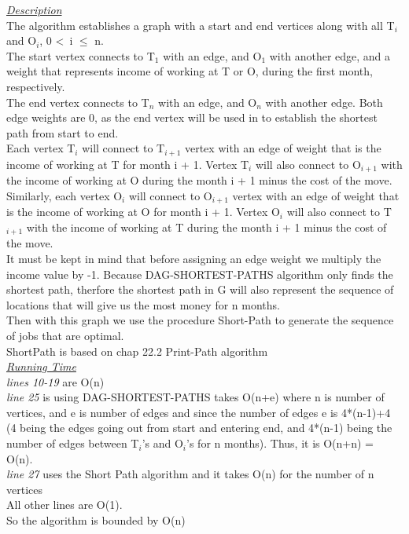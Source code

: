 \documentclass[10pt]{csc_assignment}
\begin{document}
\begin{description}
\emph{\underline{Description}}\\
The algorithm establishes a graph with a start and end vertices along with all T$_{i}$ and O$_{i}$, 0 \textless ~i $\leqslant$ n.\\
The start vertex connects to T$_{1}$ with an edge, and O$_{1}$ with another edge, and a weight that represents income of working at T or O, during the first month, respectively.\\
The end vertex connects to T$_{n}$ with an edge, and O$_{n}$ with another edge. Both edge weights are 0, as the end vertex will be used in to establish the shortest path from start to end.\\
Each vertex T$_{i}$ will connect to T$_{i+1}$ vertex with an edge of weight that is the income of working at T for month i + 1. Vertex T$_{i}$ will also connect to O$_{i+1}$ with the income of working at O during the month i + 1 minus the cost of the move.\\
Similarly, each vertex O$_{i}$ will connect to O$_{i+1}$ vertex with an edge of weight that is the income of working at O for month i + 1. Vertex O$_{i}$ will also connect to T$_{i+1}$ with the income of working at T during the month i + 1 minus the cost of the move.\\
It must be kept in mind that before assigning an edge weight we multiply the income value by -1. Because DAG-SHORTEST-PATHS algorithm only finds the shortest path, therfore the shortest path in G will also represent the sequence of locations that will give us the most money for n months.\\
Then with this graph we use the procedure Short-Path to generate the sequence of jobs that are optimal.\\
ShortPath is based on chap 22.2 Print-Path algorithm\\
\emph{\underline{Running Time}}\\
\emph{lines 10-19} are O(n)\\
\emph{line 25} is using DAG-SHORTEST-PATHS takes O(n+e) where n is number of vertices, and e is number of edges and since the number of edges e is 4*(n-1)+4 (4 being the edges going out from start and entering end, and 4*(n-1) being the number of edges between T$_{i}$'s and O$_{i}$'s for n months). Thus, it is O(n+n) = O(n). \\
\emph{line 27} uses the Short Path algorithm and it takes O(n) for the number of n vertices\\
All other lines are O(1).\\
So the algorithm is bounded by O(n) \\

\end{description}
\end{document}
